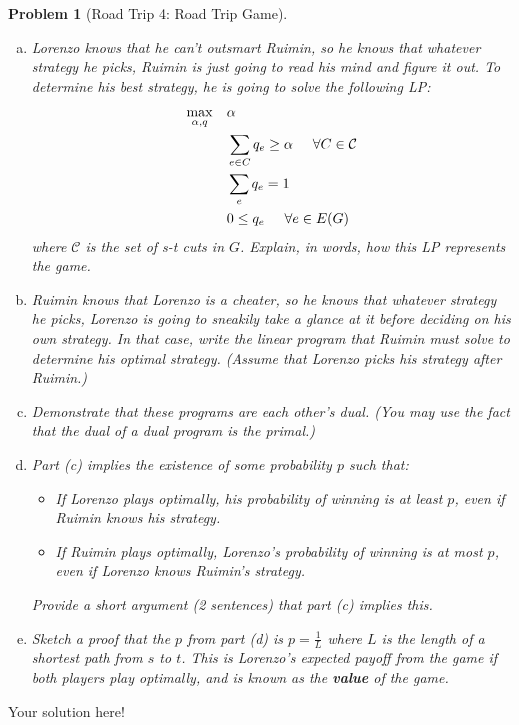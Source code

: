 \documentclass[10pt]{article}
\newtheorem{problem}{\sc\color{cit}Problem}
\begin{document}
\begin{problem}[Road Trip 4: Road Trip Game]
\begin{enumerate}[(a)]
    \item Lorenzo knows that he can't outsmart Ruimin, so he knows that whatever strategy he picks, Ruimin is just going to read his mind and figure it out. To determine his best strategy, he is going to solve the following LP:
    \begin{align*}
        \max_{\alpha, q}\quad& \alpha \\
        &  \sum_{e \in C} q_e \geq \alpha  \hspace{0.5cm} \forall C \in \mathcal{C}\\
        & \sum_e q_e = 1\\
        & 0 \leq q_e  \hspace{0.5cm} \forall e \in E(G)
    \end{align*}
    where $\mathcal{C}$ is the set of s-t cuts in $G$. Explain, in words, how this LP represents the game. 
    \item Ruimin knows that Lorenzo is a cheater, so he knows that whatever strategy he picks, Lorenzo is going to sneakily take a glance at it before deciding on his own strategy. In that case, write the linear program that Ruimin must solve to determine his optimal strategy. (Assume that Lorenzo picks his strategy after Ruimin.)
    \item Demonstrate that these programs are each other's dual. (You may use the fact that the dual of a dual program is the primal.)
    \item Part (c) implies the existence of some probability $p$ such that:
    \begin{itemize}
        \item If Lorenzo plays optimally, his probability of winning is at least $p$, even if Ruimin knows his strategy.
        \item If Ruimin plays optimally, Lorenzo's probability of winning is at most $p$, even if Lorenzo knows Ruimin's strategy.
    \end{itemize}
    Provide a short argument (2 sentences) that part (c) implies this. 
    \item Sketch a proof that the $p$ from part (d) is $p=\frac{1}{L}$ where $L$ is the length of a shortest path from $s$ to $t$. This is Lorenzo's expected payoff from the game if both players play optimally, and is known as the \textbf{value} of the game. 
\end{enumerate}
\end{problem}


\begin{solution}
Your solution here!
\end{solution}
\end{document}
